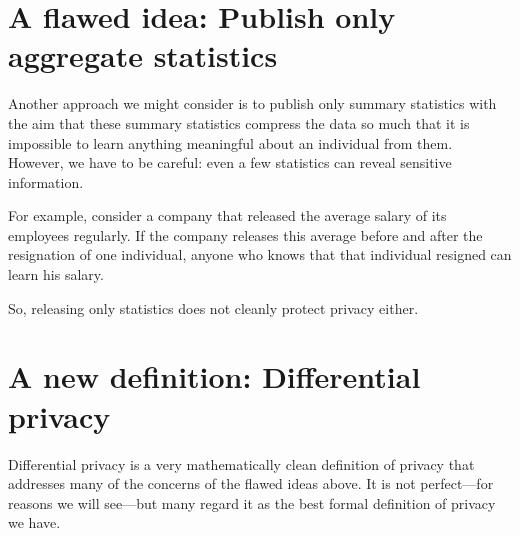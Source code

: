 \iffalse

Taking advantage of our growing capability to collect all kinds of data, computation allows us to learn from this data and use it to make predictions. For example, machine learning algorithms are trained on huge datasets and then used to predict features of new input data. 

In order for these predictions to be meaningfully useful, the data they base their predictions on must be based in reality. If researchers are designing a system to predict whether a patient has a certain disease, they need real patient data to base their model on. However, this data is very sensitive: the US has all kinds of laws protecting medical data with strict requirements. Ideally, we would like to use the data itself without the ability to tell who the data corresponds to. This way, we can alleviate privacy concerns.

However, this problem of using data while protecting the privacy of the individuals that the data comes from proves to be very hard.
\fi

\section{A flawed idea: Publish only aggregate statistics}
Another approach we might consider is to publish only summary statistics with the aim that these summary statistics compress the data so much that it is impossible to learn anything meaningful about an individual from them. However, we have to be careful: even a few statistics can reveal sensitive information.

For example, consider a company that released the average salary of its employees regularly. If the company releases this average before and after the resignation of one individual, anyone who knows that that individual resigned can learn his salary.

So, releasing only statistics does not cleanly protect privacy either. 

\section{A new definition: Differential privacy}
\label{sec:dp:defn}

Differential privacy is a very mathematically clean definition of privacy that addresses
many of the concerns of the flawed ideas above.
It is not perfect---for reasons we will see---but many regard it as 
the best formal definition of privacy we have.

